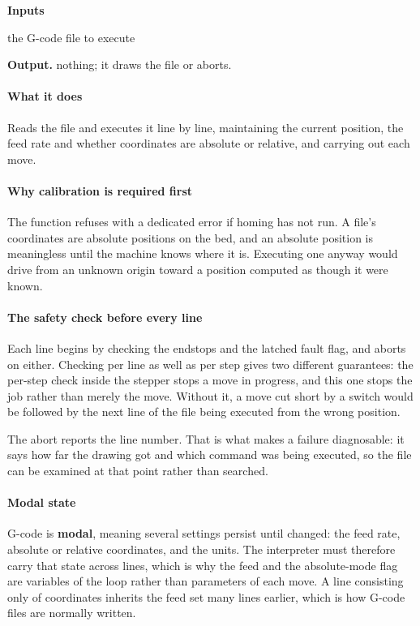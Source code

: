 \noindent\textbf{Inputs}
\begin{description}[leftmargin=2.2em,style=nextline,font=\normalfont\ttfamily]\setlength\itemsep{1pt}
  \item[{path}] \normalfont the G-code file to execute
\end{description}

\noindent\textbf{Output.} nothing; it draws the file or aborts.


\paragraph{What it does}
Reads the file and executes it line by line, maintaining the current position, the feed rate and whether coordinates are absolute or relative, and carrying out each move.


\paragraph{Why calibration is required first}
The function refuses with a dedicated error if homing has not run. A file's coordinates are absolute positions on the bed, and an absolute position is meaningless until the machine knows where it is. Executing one anyway would drive from an unknown origin toward a position computed as though it were known.


\paragraph{The safety check before every line}
Each line begins by checking the endstops and the latched fault flag, and aborts on either. Checking per line as well as per step gives two different guarantees: the per-step check inside the stepper stops a move in progress, and this one stops the job rather than merely the move. Without it, a move cut short by a switch would be followed by the next line of the file being executed from the wrong position.

The abort reports the line number. That is what makes a failure diagnosable: it says how far the drawing got and which command was being executed, so the file can be examined at that point rather than searched.


\paragraph{Modal state}
G-code is \textbf{modal}, meaning several settings persist until changed: the feed rate, absolute or relative coordinates, and the units. The interpreter must therefore carry that state across lines, which is why the feed and the absolute-mode flag are variables of the loop rather than parameters of each move. A line consisting only of coordinates inherits the feed set many lines earlier, which is how G-code files are normally written.


